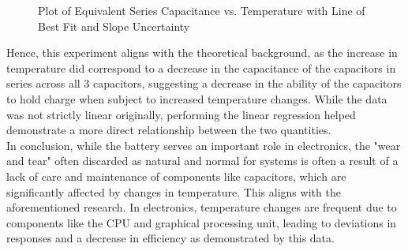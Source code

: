 \documentclass[12pt]{article}
\numberwithin{equation}{section}
\begin{document}
\begin{figure}[h!]
\centering
{}
\caption{Plot of Equivalent Series Capacitance vs. Temperature with Line of Best Fit and Slope Uncertainty}
\end{figure}
\noindent Hence, this experiment aligns with the theoretical background, as the increase in temperature did correspond to a decrease in the capacitance of the capacitors in series across all 3 capacitors, suggesting a decrease in the ability of the capacitors to hold charge when subject to increased temperature changes. While the data was not strictly linear originally, performing the linear regression helped demonstrate a more direct relationship between the two quantities.\\
\noindent In conclusion, while the battery serves an important role in electronics, the "wear and tear" often discarded as natural and normal for systems is often a result of a lack of care and maintenance of components like capacitors, which are significantly affected by changes in temperature. This aligns with the aforementioned research. In electronics, temperature changes are frequent due to components like the CPU and graphical processing unit, leading to deviations in responses and a decrease in efficiency as demonstrated by this data.
\end{document}

